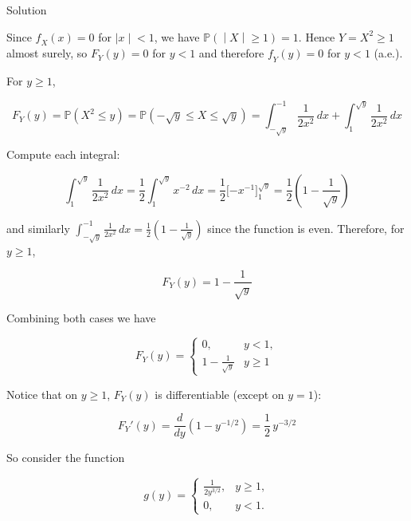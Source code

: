 \begin{qlsolution}{Solution}

Since \(\mathit{f}_{\mathit{X}}(\mathit{x}) = 0\) for \(\left. |\mathit{x} \middle| < 1 \right.\), we have \(\left. \mathbb{P}( \middle| \mathit{X} \middle| \geq 1) = 1 \right.\). Hence \(\mathit{Y} = \mathit{X}^{2} \geq 1\) almost surely, so \(\mathit{F}_{\mathit{Y}}(\mathit{y}) = 0\) for \(\mathit{y} < 1\) and therefore \(\mathit{f}_{\mathit{Y}}(\mathit{y}) = 0\) for \(\mathit{y} < 1\) (a.e.).

For \(\mathit{y} \geq 1\),

\[\mathit{F}_{\mathit{Y}}(\mathit{y}) = \mathbb{P}(\mathit{X}^{2} \leq \mathit{y}) = \mathbb{P}( - \sqrt{\mathit{y}} \leq \mathit{X} \leq \sqrt{\mathit{y}}) = \int_{- \sqrt{\mathit{y}}}^{- 1}\frac{1}{2\mathit{x}^{2}}\,\mathit{d}\mathit{x} + \int_{1}^{\sqrt{\mathit{y}}}\frac{1}{2\mathit{x}^{2}}\,\mathit{d}\mathit{x}\]

Compute each integral:

\[\int_{1}^{\sqrt{\mathit{y}}}\frac{1}{2\mathit{x}^{2}}\,\mathit{d}\mathit{x} = \frac{1}{2}\int_{1}^{\sqrt{\mathit{y}}}\mathit{x}^{- 2}\,\mathit{d}\mathit{x} = \frac{1}{2}\lbrack - \mathit{x}^{- 1}\rbrack_{1}^{\sqrt{\mathit{y}}} = \frac{1}{2}\left( {1 - \frac{1}{\sqrt{\mathit{y}}}} \right)\]

and similarly \(\int_{- \sqrt{\mathit{y}}}^{- 1}\frac{1}{2\mathit{x}^{2}}\,\mathit{d}\mathit{x} = \frac{1}{2}\left( {1 - \frac{1}{\sqrt{\mathit{y}}}} \right)\) since the function is even. Therefore, for \(\mathit{y} \geq 1\),

\[\mathit{F}_{\mathit{Y}}(\mathit{y}) = 1 - \frac{1}{\sqrt{\mathit{y}}}\]

Combining both cases we have

\[\mathit{F}_{\mathit{Y}}(\mathit{y}) = \left\{ \begin{matrix}
{0,} & {\mathit{y} < 1,} \\
{1 - \frac{1}{\sqrt{\mathit{y}}}} & {\mathit{y} \geq 1}
\end{matrix} \right.\]

Notice that on \(\mathit{y} \geq 1\), \(\mathit{F}_{\mathit{Y}}(\mathit{y})\) is differentiable (except on \(\mathit{y} = 1\)):

\[\mathit{F}_{\mathit{Y}}'(\mathit{y}) = \frac{\mathit{d}}{\mathit{d}\mathit{y}}\left( {1 - \mathit{y}^{- 1/2}} \right) = \frac{1}{2}\,\mathit{y}^{- 3/2}\]

So consider the function

\[\mathit{g}(\mathit{y}) = \left\{ \begin{matrix}
{\frac{1}{2\mathit{y}^{3/2}},} & {\mathit{y} \geq 1,} \\
{0,} & {\mathit{y} < 1.}
\end{matrix} \right.\]


\end{qlsolution}
